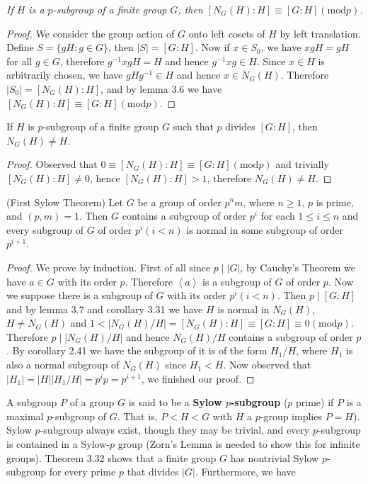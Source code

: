 \begin{lemma}\em
If $H$ is a $p$-subgroup of a finite group $G$, then $[N_G(H):H]\equiv[G:H](\mathrm{mod}p)$.
\end{lemma}
\begin{proof}
We consider the group action of $G$ onto left cosets of $H$ by left translation. Define $S=\{gH:g\in G\}$, then $|S|=[G:H]$. Now if $x\in S_0$, we have $xgH=gH$ for all $g\in G$, therefore $g^{-1}xgH=H$ and hence $g^{-1}xg\in H$. Since $x\in H$ is arbitrarily chosen, we have $gHg^{-1}\in H$ and hence $x\in N_G(H)$. Therefore $|S_0|=[N_G(H):H]$, and by lemma 3.6 we have $[N_G(H):H]\equiv[G:H](\mathrm{mod}p)$.
\end{proof}
\begin{corollary}
If $H$ is $p$-subgroup of a finite group $G$ such that $p$ divides $[G:H]$, then $N_G(H)\ne H$.
\end{corollary}
\begin{proof}
Observed that $0\equiv \left[ N_G\left( H \right) :H \right] \equiv \left[ G:H \right] \left( \mathrm{mod}p \right) $ and trivially $[N_G(H):H]\ne 0$, hence $[N_G(H):H]>1$, therefore $N_G(H)\ne H$.
\end{proof}
\begin{theorem}(First Sylow Theorem)
Let $G$ be a group of order $p^nm$, where $n\ge 1$, $p$ is prime, and $(p,m)=1$. Then $G$ contains a subgroup of order $p^i$ for each $1\le i\le n$ and every subgroup of $G$ of order $p^i(i<n)$ is normal in some subgroup of order $p^{i+1}$.
\end{theorem}
\begin{proof}
We prove by induction. First of all since $p\mid|G|$, by Cauchy's Theorem we have $a\in G$ with its order $p$. Therefore $\left<a\right>$ is a subgroup of $G$ of order $p$. Now we suppose there is a subgroup of $G$ with its order $p^i(i<n)$. Then $p\mid[G:H]$ and by lemma 3.7 and corollary 3.31 we have $H$ is normal in $N_G(H)$, $H\ne N_G(H)$ and $1<\left| N_G\left( H \right) /H \right|=\left[ N_G\left( H \right) :H \right] \equiv \left[ G:H \right] \equiv 0\left( \mathrm{mod}p \right) $. Therefore $p\mid \left| N_G\left( H \right) /H \right|$ and hence $N_G(H)/H$ contains a subgroup of order $p$. By corollary 2.41 we have the subgroup of it is of the form $H_1/H$, where $H_1$ is also a normal subgroup of $N_G(H)$ since $H_1<H$. Now observed that $\left| H_1 \right|=\left| H \right|\left| H_1/H \right|=p^ip=p^{i+1}$, we finished our proof.
\end{proof}
A subgroup $P$ of a group $G$ is said to be a \textbf{Sylow $p$-subgroup} ($p$ prime) if $P$ is a maximal $p$-subgroup of $G$. That is, $P<H<G$ with $H$ a $p$-group implies $P=H$). Sylow $p$-subgroup always exist, though they may be trivial, and every $p$-subgroup is contained in a Sylow-$p$ group (Zorn's Lemma is needed to show this for infinite groups). Theorem 3.32 shows that a finite group $G$ has nontrivial Sylow $p$-subgroup for every prime $p$ that divides $|G|$. Furthermore, we have
